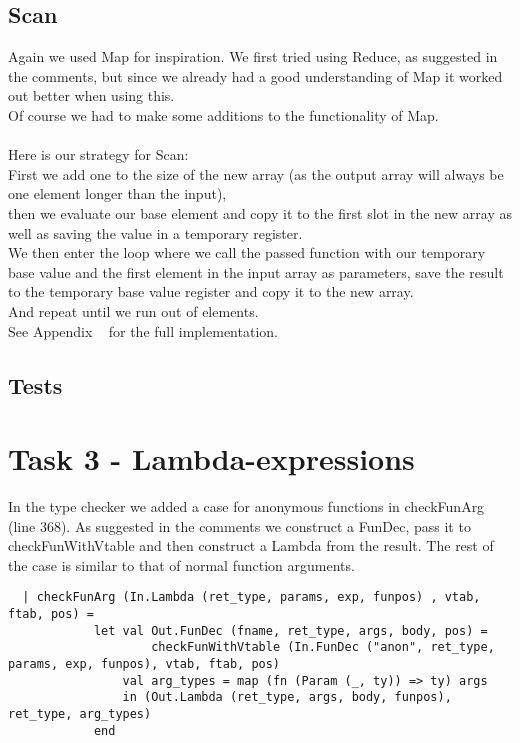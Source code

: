 \documentclass{article}
\begin{document}
\subsection{Scan}
Again we used Map for inspiration. We first tried using Reduce, as suggested in the comments, but since we already had a good understanding of Map it worked out better when using this.\\

\noindent Of course we had to make some additions to the functionality of Map.\\\\
Here is our strategy for Scan:\\
First we add one to the size of the new array (as the output array will always be one element longer than the input),\\
then we evaluate our base element and copy it to the first slot in the new array as well as saving the value in a temporary register.\\
We then enter the loop where we call the passed function with our temporary base value and the first element in the input array as parameters, save the result to the temporary base value register and copy it to the new array.\\
And repeat until we run out of elements.\\
See Appendix ~ for the full implementation.


\subsection{Tests}

\newpage

\section{Task 3 - Lambda-expressions}
In the type checker we added a case for anonymous functions in checkFunArg (line 368). As suggested in the comments we construct a FunDec, pass it to checkFunWithVtable and then construct a Lambda from the result. The rest of the case is similar to that of normal function arguments.\\
\begin{lstlisting}
  | checkFunArg (In.Lambda (ret_type, params, exp, funpos) , vtab, ftab, pos) =
            let val Out.FunDec (fname, ret_type, args, body, pos) = 
                    checkFunWithVtable (In.FunDec ("anon", ret_type, params, exp, funpos), vtab, ftab, pos)
                val arg_types = map (fn (Param (_, ty)) => ty) args
                in (Out.Lambda (ret_type, args, body, funpos), ret_type, arg_types)
            end
\end{lstlisting}
\end{document}
